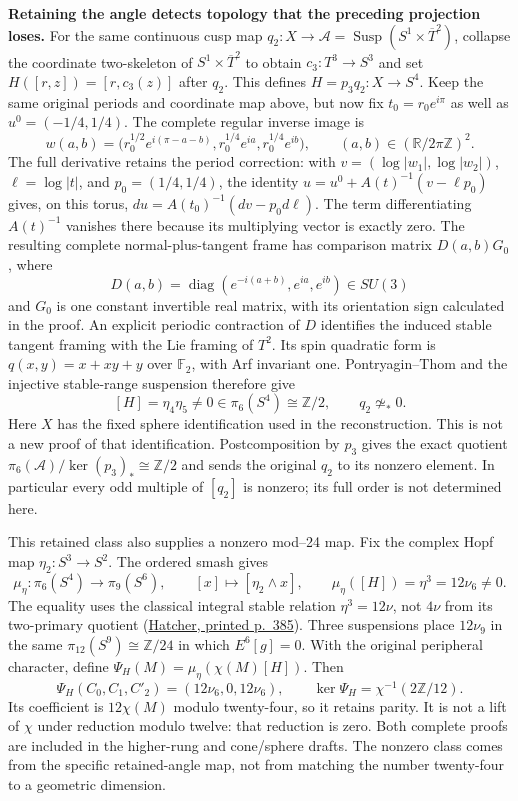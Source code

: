 \documentclass[10pt,letterpaper]{article}
\begin{document}
\noindent\textbf{Retaining the angle detects topology that the preceding
projection loses.}
For the same continuous cusp map
$q_2:X\to\mathcal A=\operatorname{Susp}(S^1\times\overline T^2)$,
collapse the coordinate two-skeleton of $S^1\times\overline T^2$
to obtain $c_3:T^3\to S^3$ and set
$H([r,z])=[r,c_3(z)]$ after $q_2$. This defines
$H=p_3q_2:X\to S^4$. Keep the same original periods and coordinate
map above, but now fix $t_0=r_0e^{i\pi}$ as well as
$u^0=(-1/4,1/4)$. The complete regular inverse image is
\[
 w(a,b)=\bigl(r_0^{1/2}e^{i(\pi-a-b)},
              r_0^{1/4}e^{ia},r_0^{1/4}e^{ib}\bigr),
 \qquad (a,b)\in(\mathbb R/2\pi\mathbb Z)^2.
\]
The full derivative retains the period correction: with
$v=(\log|w_1|,\log|w_2|)$, $\ell=\log|t|$, and
$p_0=(1/4,1/4)$, the identity
$u=u^0+A(t)^{-1}(v-\ell p_0)$ gives, on this torus,
$du=A(t_0)^{-1}(dv-p_0d\ell)$. The term differentiating
$A(t)^{-1}$ vanishes there because its multiplying vector is exactly
zero. The resulting complete normal-plus-tangent frame has comparison
matrix $D(a,b)G_0$, where
\[
 D(a,b)=\operatorname{diag}(e^{-i(a+b)},e^{ia},e^{ib})\in SU(3)
\]
and $G_0$ is one constant invertible real matrix, with its orientation
sign calculated in the proof. An explicit periodic contraction of $D$
identifies the induced stable tangent framing with the Lie framing of
$T^2$. Its spin quadratic form is $q(x,y)=x+xy+y$ over
$\mathbb F_2$, with Arf invariant one. Pontryagin--Thom and the
injective stable-range suspension therefore give
\[
 [H]=\eta_4\eta_5\ne0\in\pi_6(S^4)\cong\mathbb Z/2,
 \qquad q_2\not\simeq_*0.
\]
Here $X$ has the fixed sphere identification used in the reconstruction.
This is not a new proof of that identification. Postcomposition by
$p_3$ gives the exact quotient
$\pi_6(\mathcal A)/\ker(p_3)_*\cong\mathbb Z/2$ and sends
the original $q_2$ to its nonzero element. In particular every odd
multiple of $[q_2]$ is nonzero; its full order is not determined here.

This retained class also supplies a nonzero mod--24 map. Fix the
complex Hopf map $\eta_2:S^3\to S^2$. The ordered smash gives
\[
 \mu_\eta:\pi_6(S^4)\longrightarrow\pi_9(S^6),
 \qquad [x]\longmapsto[\eta_2\wedge x],\qquad
 \mu_\eta([H])=\eta^3=12\nu_6\ne0.
\]
The equality uses the classical integral stable relation
$\eta^3=12\nu$, not $4\nu$ from its two-primary quotient
(\href{https://pi.math.cornell.edu/~hatcher/AT/AT.pdf}{Hatcher,
printed p.~385}). Three suspensions place $12\nu_9$ in the same
$\pi_{12}(S^9)\cong\mathbb Z/24$ in which $E^6[g]=0$.
With the original peripheral character, define
$\Psi_H(M)=\mu_\eta(\chi(M)[H])$. Then
\[
 \Psi_H(C_0,C_1,C'_2)=(12\nu_6,0,12\nu_6),\qquad
 \ker\Psi_H=\chi^{-1}(2\mathbb Z/12).
\]
Its coefficient is $12\chi(M)$ modulo twenty-four, so it retains
parity. It is not a lift of $\chi$ under reduction modulo twelve:
that reduction is zero. Both complete proofs are included in the
higher-rung and cone/sphere drafts. The nonzero class comes from the
specific retained-angle map, not from matching the number twenty-four
to a geometric dimension.
\end{document}
